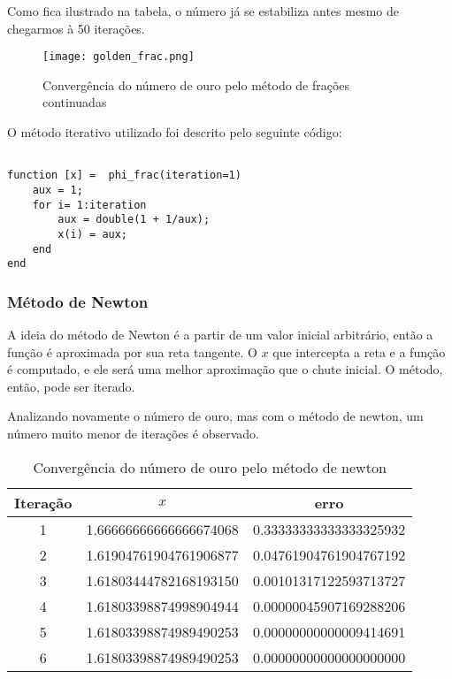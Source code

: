 Como fica ilustrado na tabela, o número já se estabiliza antes mesmo de
chegarmos à 50 iterações.

\begin{figure}[H]
    \centering
    \texttt{[image: golden\_frac.png]}
    \caption{Convergência do número de ouro pelo método de frações continuadas}
    \label{golden_frac}
\end{figure}


O método iterativo utilizado foi descrito pelo seguinte código:

\begin{lstlisting}

function [x] =  phi_frac(iteration=1)
	aux = 1;
	for i= 1:iteration
		aux = double(1 + 1/aux);
		x(i) = aux;
	end
end

\end{lstlisting}

\subsubsection{Método de Newton}

A ideia do método de Newton é a partir de um valor inicial arbitrário, então a
função é aproximada por sua reta tangente. O $x$ que intercepta a reta e a
função é computado, e ele será uma melhor aproximação que o chute inicial. O
método, então, pode ser iterado.

Analizando novamente o número de ouro, mas com o método de newton, um número
muito menor de iterações é observado.

\begin{table}[H]
	\centering
	\begin{tabular}{|c|c|c|}
		\hline
		Iteração & $x$ & erro \\
		\hline
		1 & 1.66666666666666674068 & 0.33333333333333325932 \\
		\hline
		2 & 1.61904761904761906877 & 0.04761904761904767192 \\
		\hline
		3 & 1.61803444782168193150 & 0.00101317122593713727 \\
		\hline
		4 & 1.61803398874998904944 & 0.00000045907169288206 \\
		\hline
		5 & 1.61803398874989490253 & 0.00000000000009414691 \\
		\hline
		6 & 1.61803398874989490253 & 0.00000000000000000000 \\
		\hline
	 \end{tabular}
	\label{golden_newton}
	\caption{Convergência do número de ouro pelo método de newton}
\end{table}

